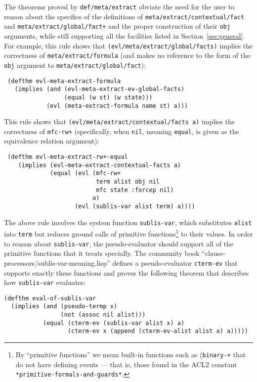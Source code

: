 The theorems proved by \texttt{def\-/meta\-/extract} obviate the need for the user to reason about
the specifics of the definitions of
\texttt{meta\-/extract\-/contextual\-/fact} and
\texttt{meta\-/extract\-/global\-/fact+} and the proper construction
of their \texttt{obj} arguments, while still supporting all the facilities listed in Section~\ref{sec:general}.
For example, this rule shows that
\texttt{(evl\-/meta\-/extract\-/global\-/facts)} implies the correctness of \texttt{meta\-/extract\-/formula} (and makes no reference to the form of the \texttt{obj} argument to \texttt{meta\-/extract\-/global\-/fact}):
\begin{verbatim}
 (defthm evl-meta-extract-formula
   (implies (and (evl-meta-extract-ev-global-facts)
                 (equal (w st) (w state)))
            (evl (meta-extract-formula name st) a)))

\end{verbatim}
This rule shows that
\texttt{(evl\-/meta\-/extract\-/contextual\-/facts a)} implies the correctness
of \texttt{mfc-rw+} (specifically, when \texttt{nil}, meaning
\texttt{equal}, is given as the equivalence relation argument):
\begin{verbatim}
 (defthm evl-meta-extract-rw+-equal
    (implies (evl-meta-extract-contextual-facts a)
             (equal (evl (mfc-rw+
                          term alist obj nil
                          mfc state :forcep nil)
                         a)
                    (evl (sublis-var alist term) a))))
\end{verbatim}
The above rule involves the system function {\tt sublis-var}, which
substitutes {\tt alist} into {\tt term} but reduces ground calls of
primitive functions\footnote{By ``primitive functions'' we mean
  built-in functions such as ({\tt binary-+} that do not have defining
  events --- that is, those found in the ACL2 constant {\tt
    *primitive-formals-and-guards*}.} to their values.  In order to
reason about {\tt sublis-var}, the pseudo-evaluator should support all of
the primitive functions that it treats specially.  The community book
``clause-processors/sublis-var-meaning.lisp'' defines a
pseudo-evaluator {\tt cterm-ev} that supports exactly these functions
and proves the following theorem that describes how {\tt sublis-var}
evaluates:
\begin{verbatim}
(defthm eval-of-sublis-var
  (implies (and (pseudo-termp x)
                (not (assoc nil alist)))
           (equal (cterm-ev (sublis-var alist x) a)
                  (cterm-ev x (append (cterm-ev-alist alist a) a)))))
\end{verbatim}

